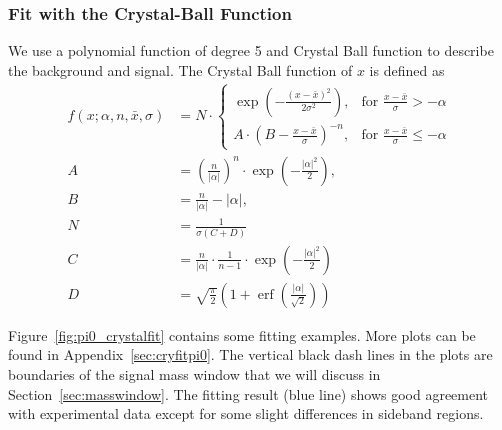 \subsubsection{Fit with the Crystal-Ball Function}
\label{sec:crystalBallFit}
We use a polynomial function of degree 5 and Crystal Ball function to describe the background and signal. The Crystal Ball function of $x$ is defined as~\cite{CrystalBallFunc}
\begin{subequations}
\begin{align}
f(x;\alpha,n,\bar x,\sigma) & = N \cdot \begin{cases} \exp(- \frac{(x - \bar x)^2}{2 \sigma^2}), & \mbox{for }\frac{x - \bar x}{\sigma} > -\alpha \\
 A \cdot (B - \frac{x - \bar x}{\sigma})^{-n}, & \mbox{for }\frac{x - \bar x}{\sigma} \leqslant -\alpha \end{cases}\\
A & = \left(\frac{n}{\left| \alpha \right|}\right)^n \cdot \exp\left(- \frac {\left| \alpha \right|^2}{2}\right), \\
B &= \frac{n}{\left| \alpha \right|}  - \left| \alpha \right|,\\
N &= \frac{1}{\sigma (C + D)}\\
C &= \frac{n}{\left| \alpha \right|} \cdot \frac{1}{n-1} \cdot \exp\left(- \frac {\left| \alpha \right|^2}{2}\right) \\
D &= \sqrt{\frac{\pi}{2}} \left(1 + \operatorname{erf}\left(\frac{\left| \alpha \right|}{\sqrt 2}\right)\right) 
\end{align}
\label{eqn:crystalball}
\end{subequations}

Figure~\ref{fig:pi0_crystalfit} contains some fitting examples. More plots can be found in Appendix~\ref{sec:cryfitpi0}. 
The vertical black dash lines in the plots are boundaries of the signal mass window that we will discuss in Section~\ref{sec:masswindow}. 
The fitting result (blue line) shows good agreement with experimental data except for some slight differences in sideband regions. 


